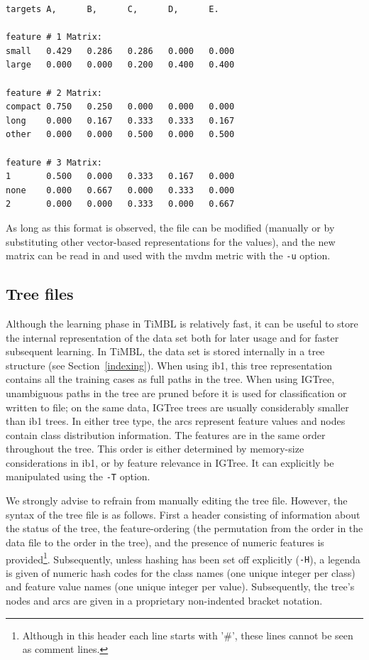 \documentclass{book}
\begin{document}
\begin{footnotesize}
\begin{verbatim}
targets A,      B,      C,      D,      E.

feature # 1 Matrix:
small   0.429   0.286   0.286   0.000   0.000
large   0.000   0.000   0.200   0.400   0.400

feature # 2 Matrix:
compact 0.750   0.250   0.000   0.000   0.000
long    0.000   0.167   0.333   0.333   0.167
other   0.000   0.000   0.500   0.000   0.500

feature # 3 Matrix:
1       0.500   0.000   0.333   0.167   0.000
none    0.000   0.667   0.000   0.333   0.000
2       0.000   0.000   0.333   0.000   0.667
\end{verbatim}
\end{footnotesize}

As long as this format is observed, the file can be modified (manually
or by substituting other vector-based representations for the
values), and the new matrix can be read in and used with the {\sc
mvdm} metric with the {\tt -u} option.

\subsection{Tree files}
\label{treeformat}

Although the learning phase in TiMBL is relatively fast, it can be
useful to store the internal representation of the data set both for
later usage and for faster subsequent learning. In TiMBL, the data set
is stored internally in a tree structure (see
Section~\ref{indexing}). When using {\sc ib1}, this tree
representation contains all the training cases as full paths in the
tree. When using {\sc IGTree}, unambiguous paths in the tree are
pruned before it is used for classification or written to file; on the
same data, {\sc IGTree} trees are usually considerably smaller than
{\sc ib1} trees. In either tree type, the arcs represent feature
values and nodes contain class distribution information. The features
are in the same order throughout the tree. This order is either
determined by memory-size considerations in {\sc ib1}, or by feature
relevance in {\sc IGTree}. It can explicitly be manipulated using the
{\tt -T} option.

We strongly advise to refrain from manually editing the tree
file. However, the syntax of the tree file is as follows. First a
header consisting of information about the status of the tree, the
feature-ordering (the permutation from the order in the data file to
the order in the tree), and the presence of numeric features is
provided\footnote{Although in this header each line starts with '\#',
  these lines cannot be seen as comment lines.}. Subsequently, unless
hashing has been set off explicitly ({\tt -H}), a legenda is given of
numeric hash codes for the class names (one unique integer per class)
and feature value names (one unique integer per value).  Subsequently,
the tree's nodes and arcs are given in a proprietary non-indented
bracket notation.
\end{document}
